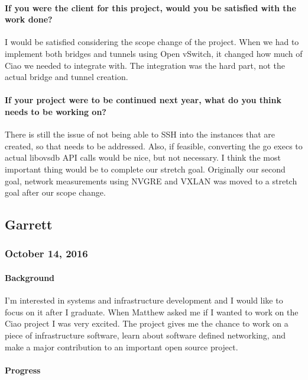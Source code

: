 \documentclass[10pt,onecolumn,journal,draftclsnofoot]{IEEEtran}
\begin{document}
\paragraph{If you were the client for this project, would you be
satisfied with the work
done?} 

I would be satisfied considering the scope change of the project. When
we had to implement both bridges and tunnels using Open vSwitch, it
changed how much of Ciao we needed to integrate with. The integration
was the hard part, not the actual bridge and tunnel creation.

\paragraph{If your project were to be continued next year, what do
you think needs to be working
on?} 

There is still the issue of not being able to SSH into the instances
that are created, so that needs to be addressed. Also, if feasible,
converting the go execs to actual libovsdb API calls would be nice, but
not necessary. I think the most important thing would be to complete our
stretch goal. Originally our second goal, network measurements using
NVGRE and VXLAN was moved to a stretch goal after our scope change.

\subsection{Garrett}
\subsubsection{October 14, 2016} 

\paragraph{Background} 

I'm interested in systems and infrastructure development and I would
like to focus on it after I graduate. When Matthew asked me if I wanted
to work on the Ciao project I was very excited. The project gives me the
chance to work on a piece of infrastructure software, learn about
software defined networking, and make a major contribution to an
important open source project.

\paragraph{Progress} 
\end{document}
